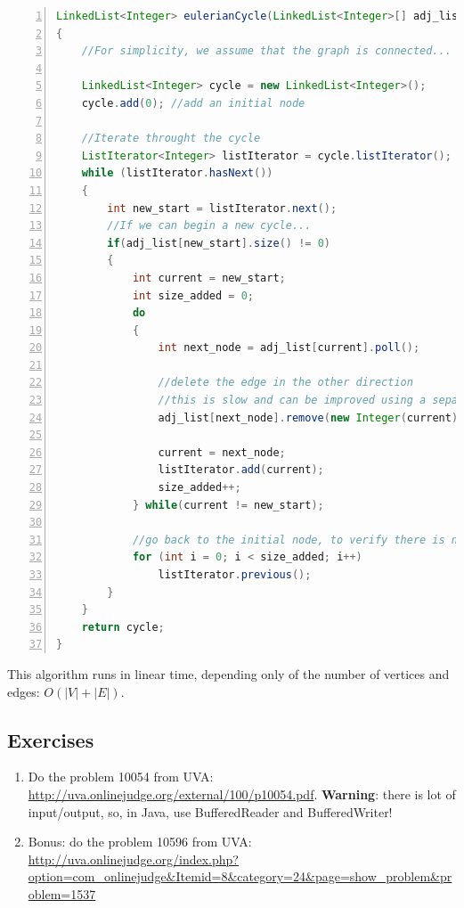 \begin{lstlisting}[label=code-eulerian,caption=Hierholzer's Algorithm, language=Java, tabsize=2, breaklines=true, numbers=left]
LinkedList<Integer> eulerianCycle(LinkedList<Integer>[] adj_list)
{
	//For simplicity, we assume that the graph is connected...
		
	LinkedList<Integer> cycle = new LinkedList<Integer>();
	cycle.add(0); //add an initial node
		
	//Iterate throught the cycle
	ListIterator<Integer> listIterator = cycle.listIterator();
    while (listIterator.hasNext())
    {
    	int new_start = listIterator.next();
    	//If we can begin a new cycle...
    	if(adj_list[new_start].size() != 0)
    	{
    		int current = new_start;
    		int size_added = 0;
    		do
    		{
    			int next_node = adj_list[current].poll();

				//delete the edge in the other direction
				//this is slow and can be improved using a separate Set
				adj_list[next_node].remove(new Integer(current));

				current = next_node;
				listIterator.add(current);
				size_added++;
			} while(current != new_start);

			//go back to the initial node, to verify there is no other edges
			for (int i = 0; i < size_added; i++)
				listIterator.previous();
		}
	}
	return cycle;
}
\end{lstlisting}

This algorithm runs in linear time, depending only of the number of vertices and edges: $O(|V|+|E|)$.

\subsection{Exercises}
\begin{enumerate}
\item Do the problem 10054 from UVA: \url{http://uva.onlinejudge.org/external/100/p10054.pdf}.
\textbf{Warning}: there is lot of input/output, so, in Java, use BufferedReader and BufferedWriter!
\item Bonus: do the problem 10596 from UVA: \url{http://uva.onlinejudge.org/index.php?option=com_onlinejudge&Itemid=8&category=24&page=show_problem&problem=1537}
\end{enumerate}